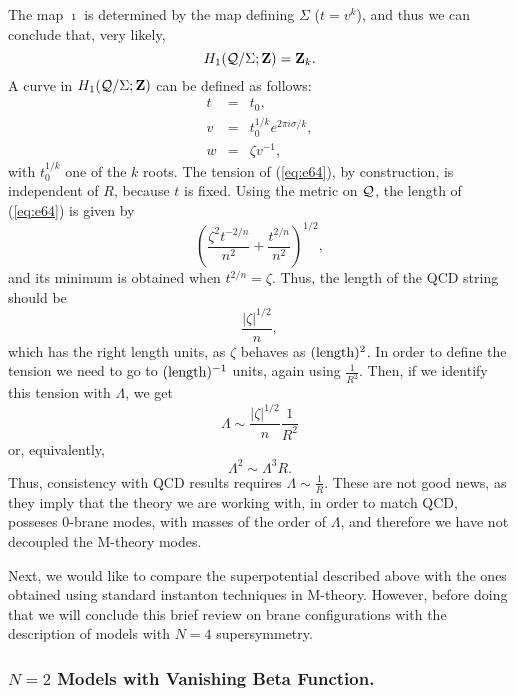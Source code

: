 The map $\imath$ is determined by the map defining $\Sigma$ ($t=v^k$), and thus 
we can conclude that, very likely,
\begin{equation}
H_1({\cal Q}/\Sigma;{\bf Z})={\bf Z}_k.
\label{eq:e63}
\end{equation}
A curve in $H_1({\cal Q}/\Sigma;{\bf Z})$ can be defined as follows:
\begin{eqnarray}
t & = & t_0, \nonumber \\
v & = & t_0^{1/k} e^{2 \pi i \sigma/k}, \nonumber \\
w & = & \zeta v^{-1},
\label{eq:e64}
\end{eqnarray}
with $t_0^{1/k}$ one of the $k$ roots. The tension of (\ref{eq:e64}), by construction, 
is independent of $R$, because $t$ is fixed. Using the metric on ${\cal Q}$, 
the length of (\ref{eq:e64}) is given by
\begin{equation}
\left( \frac {\zeta^2 t^{-2/n}}{n^2} + \frac {t^{2/n}}{n^2} \right)^{1/2},
\label{eq:e65}
\end{equation}
and its minimum is obtained when $t^{2/n}=\zeta$. Thus, the length of the QCD string 
should be
\begin{equation}
\frac {|\zeta|^{1/2}}{n},
\label{eq:e66}
\end{equation}
which has the right length units, as $\zeta$ behaves as $(\hbox
{length})^2$. In order to define the tension we need to go to
$(\hbox {length})^{-1}$ units, again using $\frac {1}{R^2}$.
Then, if we identify this tension with $\Lambda$, we get
\begin{equation}
\Lambda \sim \frac {|\zeta|^{1/2}}{n} \frac {1}{R^2}
\end{equation}
or, equivalently,
\begin{equation}
\Lambda^2 \sim \Lambda^3 R.
\end{equation}
Thus, consistency with QCD results requires $\Lambda \sim \frac
{1}{R}$. These are not good news, as they imply that the theory
we are working with, in order to match QCD, posseses $0$-brane
modes, with masses of the order of $\Lambda$, and therefore we
have not decoupled the M-theory modes.
  
  
Next, we would like to compare the superpotential described above with the 
ones obtained using standard instanton techniques in M-theory. However, 
before doing that we will conclude this brief review on brane configurations 
with the description of models with $N=4$ supersymmetry.

\subsubsection{$N=2$ Models with Vanishing Beta Function.}

